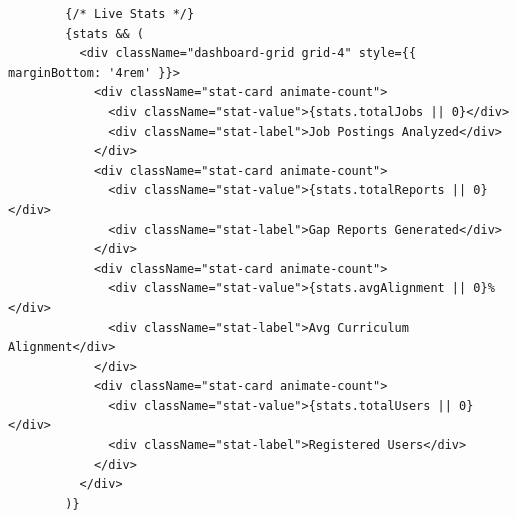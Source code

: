 \documentclass[12pt,a4paper]{report}
\begin{document}
\begin{verbatim}
        {/* Live Stats */}
        {stats && (
          <div className="dashboard-grid grid-4" style={{ marginBottom: '4rem' }}>
            <div className="stat-card animate-count">
              <div className="stat-value">{stats.totalJobs || 0}</div>
              <div className="stat-label">Job Postings Analyzed</div>
            </div>
            <div className="stat-card animate-count">
              <div className="stat-value">{stats.totalReports || 0}</div>
              <div className="stat-label">Gap Reports Generated</div>
            </div>
            <div className="stat-card animate-count">
              <div className="stat-value">{stats.avgAlignment || 0}%</div>
              <div className="stat-label">Avg Curriculum Alignment</div>
            </div>
            <div className="stat-card animate-count">
              <div className="stat-value">{stats.totalUsers || 0}</div>
              <div className="stat-label">Registered Users</div>
            </div>
          </div>
        )}


\end{verbatim}
\end{document}
